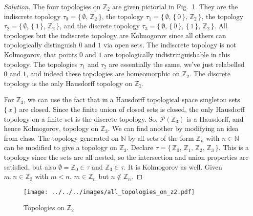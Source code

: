 \documentclass{article}
\theoremstyle{normal}
\begin{document}
    \color{black}
    \begin{proof}[Solution]
        The four topologies on $\mathbb{Z}_{2}$ are given pictorial in
        Fig.~\ref{fig:all_topologies_on_z2}. They are the indiscrete topology
        $\tau_{0}=\big\{\,\emptyset,\,\mathbb{Z}_{2}\,\big\}$, the topology
        $\tau_{1}=\big\{\,\emptyset,\,\{\,0\,\},\,\mathbb{Z}_{2}\,\big\}$,
        the topology
        $\tau_{2}=\big\{\,\emptyset,\,\{\,1\,\},\,\mathbb{Z}_{2}\,\big\}$,
        and the discrete topology
        $\tau_{3}=\big\{\,\emptyset,\,\{\,0\,\},\,\{\,1\,\},\,\mathbb{Z}_{2}\,\big\}$.
        All topologies but the indiscrete topology are Kolmogorov since all
        others can topologically distinguish $0$ and $1$ via open sets. The
        indiscrete topology is not Kolmogorov, that points $0$ and $1$ are
        topologically indistringuishable in this topology. The topologies
        $\tau_{1}$ and $\tau_{2}$ are essentially the same, we've just
        relabelled $0$ and $1$, and indeed these topologies are homeomorphic
        on $\mathbb{Z}_{2}$. The discrete topology is the only Hausdorff
        topology on $\mathbb{Z}_{2}$.
        \par\hfill\par
        For $\mathbb{Z}_{3}$, we can use the fact that in a Hausdorff
        topological space singleton sets $\{\,x\,\}$ are closed. Since the
        finite union of closed sets is closed, the only Hausdorff topology on
        a finite set is the discrete topology. So,
        $\mathcal{P}(\mathbb{Z}_{3})$ is a Hausdorff, and hence Kolmogorov,
        topology on $\mathbb{Z}_{3}$. We can find another by modifying an
        idea from class. The topology generated on $\mathbb{N}$ by all sets of
        the form $\mathbb{Z}_{n}$ with $n\in\mathbb{N}$ can be modified to
        give a topology on $\mathbb{Z}_{3}$. Declare
        $\tau=\{\,\mathbb{Z}_{0},\,\mathbb{Z}_{1},\,\mathbb{Z}_{2},\,\mathbb{Z}_{3}\,\}$.
        This is a topology since the sets are all nested, so the intersection
        and union properties are satisfied, but also
        $\emptyset=\mathbb{Z}_{0}\in\tau$ and $\mathbb{Z}_{3}\in\tau$. It is
        Kolmogorov as well. Given $m,n\in\mathbb{Z}_{3}$ with
        $m<n$, $m\in\mathbb{Z}_{n}$ but $n\notin\mathbb{Z}_{n}$.
    \end{proof}
    \begin{figure}
        \centering
        \texttt{[image: ../../../images/all\_topologies\_on\_z2.pdf]}
        \caption{Topologies on $\mathbb{Z}_{2}$}
        \label{fig:all_topologies_on_z2}
    \end{figure}
\end{document}
